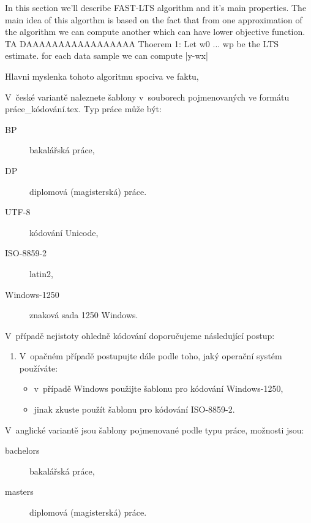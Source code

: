 
	
   
In this section we'll describe FAST-LTS algorithm and it's main properties. The main idea of this algorthm is based on the fact that from one approximation of the algorithm we can compute another which can have lower objective function.
 TA DAAAAAAAAAAAAAAAAA
Thoerem 1: \cite{rybicka}
Let w0 ... wp be the LTS estimate.
for each data sample we can compute |y-wx|



Hlavni myslenka tohoto algoritmu spociva ve faktu, 



V~české variantě naleznete šablony v~souborech pojmenovaných ve formátu práce\_kódování.tex. Typ práce může být:
\begin{description}
	\item[BP] bakalářská práce,
	\item[DP] diplomová (magisterská) práce.
\end{description}
\begin{description}
	\item[UTF-8] kódování Unicode,
	\item[ISO-8859-2] latin2,
	\item[Windows-1250] znaková sada 1250 Windows.
\end{description}
V~případě nejistoty ohledně kódování doporučujeme následující postup:
\begin{enumerate}
	\item V~opačném případě postupujte dále podle toho, jaký operační systém používáte:
	\begin{itemize}
		\item v~případě Windows použijte šablonu pro kódování \mbox{Windows-1250},
		\item jinak zkuste použít šablonu pro kódování \mbox{ISO-8859-2}.
	\end{itemize}
\end{enumerate}


V~anglické variantě jsou šablony pojmenované podle typu práce, možnosti jsou:
\begin{description}
	\item[bachelors] bakalářská práce,
	\item[masters] diplomová (magisterská) práce.
\end{description}

